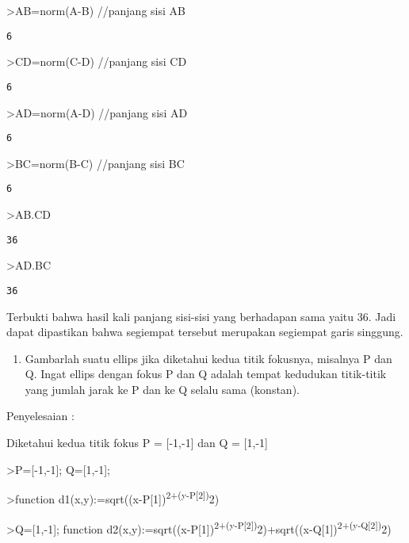 \documentclass[
]{book}
\providecommand{\tightlist}{%
  \setlength{\itemsep}{0pt}\setlength{\parskip}{0pt}}
\begin{document}
\textgreater AB=norm(A-B) //panjang sisi AB

\begin{verbatim}
6
\end{verbatim}

\textgreater CD=norm(C-D) //panjang sisi CD

\begin{verbatim}
6
\end{verbatim}

\textgreater AD=norm(A-D) //panjang sisi AD

\begin{verbatim}
6
\end{verbatim}

\textgreater BC=norm(B-C) //panjang sisi BC

\begin{verbatim}
6
\end{verbatim}

\textgreater AB.CD

\begin{verbatim}
36
\end{verbatim}

\textgreater AD.BC

\begin{verbatim}
36
\end{verbatim}

Terbukti bahwa hasil kali panjang sisi-sisi yang berhadapan sama yaitu 36. Jadi dapat dipastikan bahwa segiempat tersebut merupakan segiempat garis singgung.

\begin{enumerate}
\def\labelenumi{\arabic{enumi}.}
\setcounter{enumi}{3}
\tightlist
\item
  Gambarlah suatu ellips jika diketahui kedua titik fokusnya, misalnya P dan Q. Ingat ellips dengan fokus P dan Q adalah tempat kedudukan titik-titik yang jumlah jarak ke P dan ke Q selalu sama (konstan).
\end{enumerate}

Penyelesaian :

Diketahui kedua titik fokus P = {[}-1,-1{]} dan Q = {[}1,-1{]}

\textgreater P={[}-1,-1{]}; Q={[}1,-1{]};

\textgreater function d1(x,y):=sqrt((x-P{[}1{]})\textsuperscript{2+(y-P{[}2{]})}2)

\textgreater Q={[}1,-1{]}; function d2(x,y):=sqrt((x-P{[}1{]})\textsuperscript{2+(y-P{[}2{]})}2)+sqrt((x-Q{[}1{]})\textsuperscript{2+(y-Q{[}2{]})}2)
\end{document}
